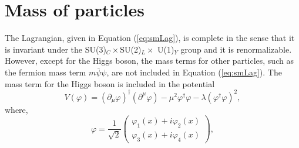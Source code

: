 
\section{Mass of particles}
\label{s:smMass}

The Lagrangian, given in Equation (\ref{eq:smLag}), is complete in the sense that it 
is invariant under the SU(3)$_C\times $SU(2)$_L\times$ U(1)$_Y$ group and it is 
renormalizable. However, except for the Higgs boson, the mass terms for
other particles, such as the fermion mass term 
$m\bar\psi \psi$, 
are not included in Equation (\ref{eq:smLag}). The 
mass term for the Higgs boson is included in the potential 
\begin{equation}
V(\varphi) = \left(\partial_\mu\varphi\right)^\dagger \left(\partial^\mu
\varphi\right) - \mu^2\varphi^\dagger\varphi - \lambda\left(
\varphi^\dagger\varphi\right)^2,
\label{eq:potPhi}
\end{equation}
where, 
\begin{equation}
\varphi = \frac{1}{\sqrt 2} \left(\begin{array}{c}\varphi_1 (x) + 
i\varphi_2 (x) \\ \varphi_3 (x) + i\varphi_4 (x) \end{array}\right),
\label{eq:higgsPhi}
\end{equation}

